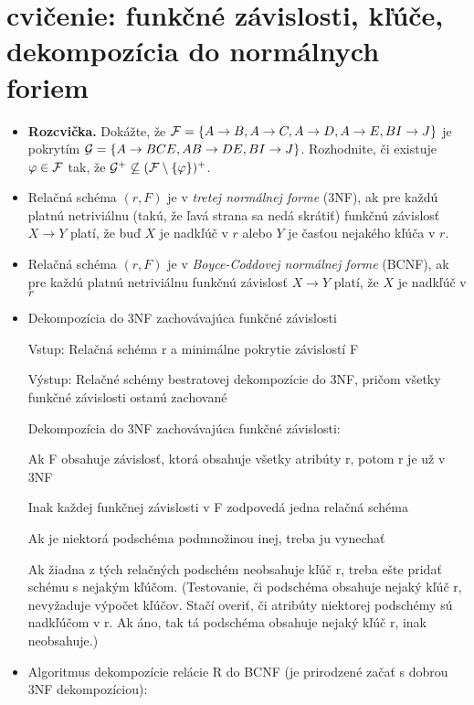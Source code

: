 \documentclass[10pt, a4paper]{article}
\begin{document}
\section{cvičenie: funkčné závislosti, kľúče, dekompozícia do normálnych foriem}

\begin{itemize}
\item {\bf Rozcvička.} Dokážte, že ${\cal F} = \{A\to B, A\to C, A\to D, A\to E, BI \to J\}$ je pokrytím ${\cal G} = \{A\to B C E, A B\to D E, B I\to J\}$.
Rozhodnite, či existuje $\varphi\in {\cal F}$ tak, že ${\cal G}^+\not\subseteq ({\cal F}\setminus\{\varphi\})^+$.

\item
Relačná schéma $(r, F)$ je v \emph{tretej normálnej forme} (3NF),
ak pre každú platnú netriviálnu (takú, že ľavá strana sa nedá
skrátiť) funkčnú závislosť $X\to Y$ platí, že buď $X$ je nadkľúč v $r$
alebo $Y$ je časťou nejakého kľúča v $r$.

\item
Relačná schéma $(r, F)$ je v \emph{Boyce-Coddovej normálnej
forme} (BCNF), ak pre každú platnú netriviálnu funkčnú závislosť
$X\to Y$ platí, že $X$ je nadkľúč v $r$

\item 
Dekompozícia do 3NF zachovávajúca funkčné závislosti

Vstup: Relačná schéma r a minimálne pokrytie závislostí F

Výstup: Relačné schémy bestratovej dekompozície do 3NF, pričom všetky funkčné závislosti ostanú zachované

Dekompozícia do 3NF zachovávajúca funkčné závislosti:

Ak F obsahuje závislosť, ktorá obsahuje všetky atribúty r, potom r je už v 3NF

Inak každej funkčnej závislosti v F zodpovedá jedna relačná
schéma

Ak je niektorá podschéma podmnožinou inej, treba ju vynechať

Ak žiadna z tých relačných podschém neobsahuje kľúč r, treba
ešte pridať schému s nejakým kľúčom. (Testovanie, či podschéma
obsahuje nejaký kľúč r, nevyžaduje výpočet kľúčov. Stačí overiť, či
atribúty niektorej podschémy sú nadkľúčom v r. Ak áno, tak tá
podschéma obsahuje nejaký kľúč r, inak neobsahuje.)

\item
Algoritmus dekompozície relácie R do BCNF (je prirodzené začať
s dobrou 3NF dekompozíciou):


\end{itemize}
\end{document}
